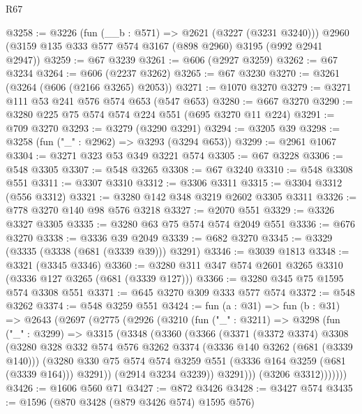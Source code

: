 \begin{lexlean}{R67}
\begin{coremodule}
@3258 := @3226
    (fun (__b : @571) => @2621 (@3227 (@3231 @3240)))
    @2960
    (@3159 @135 @333 @577 @574 @3167 (@898 @2960) @3195 (@992 @2941 @2947))
@3259 := @67 @3239
@3261 := @606 (@2927 @3259)
@3262 := @67 @3234
@3264 := @606 (@2237 @3262)
@3265 := @67 @3230
@3270 := @3261 (@3264 (@606 (@2166 @3265) @2053))
@3271 := @1070 @3270
@3279 := @3271 @111 @53 @241 @576 @574 @653 (@547 @653)
@3280 := @667 @3270
@3290 := @3280 @225 @75 @574 @574 @224 @551 (@695 @3270 @11 @224)
@3291 := @709 @3270
@3293 := @3279 (@3290 @3291)
@3294 := @3205 @39
@3298 := @3258 (fun ("_" : @2962) => @3293 (@3294 @653))
@3299 := @2961 @1067
@3304 := @3271 @323 @53 @349 @3221 @574
@3305 := @67 @3228
@3306 := @548 @3305
@3307 := @548 @3265
@3308 := @67 @3240
@3310 := @548 @3308 @551
@3311 := @3307 @3310
@3312 := @3306 @3311
@3315 := @3304 @3312 (@556 @3312)
@3321 := @3280 @142 @348 @3219 @2602 @3305 @3311
@3326 := @778 @3270 @140 @98 @576 @3218
@3327 := @2070 @551
@3329 := @3326 @3327 @3305
@3335 := @3280 @63 @75 @574 @574 @2049 @551
@3336 := @676 @3270
@3338 := @3336 @39 @2049
@3339 := @682 @3270
@3345 := @3329 (@3335 (@3338 (@681 (@3339 @39))) @3291)
@3346 := @3039 @1813
@3348 := @3321 (@3345 @3346)
@3360 := @3280 @311 @347 @574 @2601 @3265 @3310 (@3336 @127 @3265 (@681 (@3339 @127)))
@3366 := @3280 @345 @75 @1595 @574 @3308 @551
@3371 := @645 @3270 @309 @333 @577 @574
@3372 := @548 @3262
@3374 := @548 @3259 @551
@3424 := fun (a : @31) =>
  fun (b : @31) =>
  @2643
    (@2697
      (@2775
        (@2926
          (@3210
            (fun ("_" : @3211) =>
            @3298
              (fun ("_" : @3299) =>
              @3315
                (@3348
                  (@3360
                    (@3366
                      (@3371
                        (@3372 @3374)
                        @3308
                        (@3280
                          @328
                          @332
                          @574
                          @576
                          @3262
                          @3374
                          (@3336 @140 @3262 (@681 (@3339 @140)))
                          (@3280
                            @330
                            @75
                            @574
                            @574
                            @3259
                            @551
                            (@3336 @164 @3259 (@681 (@3339 @164)))
                            @3291))
                        (@2914 @3234 @3239))
                      @3291)))
                (@3206 @3312)))))))
@3426 := @1606 @560 @71
@3427 := @872 @3426
@3428 := @3427 @574
@3435 := @1596 (@870 @3428 (@879 @3426 @574) @1595 @576)

\end{coremodule}
\end{lexlean}
